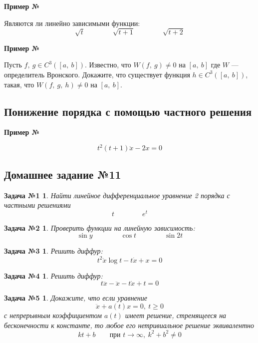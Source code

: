 \documentclass[a4paper,12pt]{article}
\newtheorem*{task1}{Задача №1}
\newtheorem*{task2}{Задача №2}
\newtheorem*{task3}{Задача №3}
\newtheorem*{task4}{Задача №4}
\newtheorem*{task5}{Задача №5}
\newcommand{\dx}{\dot{x}}
\newcommand{\ddx}{\ddot{x}}
\newcommand{\dddx}{\dddot{x}}
\renewcommand{\to}{\longrightarrow}
\begin{document}
\textbf{Пример №}

Являются ли линейно зависимыми функции:
\[\sqrt{t}\qquad \qquad \sqrt{t + 1} \qquad \qquad \sqrt{t + 2}\]

\textbf{Пример №}

Пусть $f,\ g \in C^3([a,\ b])$.
Известно, что $W(f,\ g) \neq 0$ на $[a,\ b]$ где $W$ --- определитель Вронского. 
Докажите, что существует функция $h \in C^3([a,\ b])$, такая, что $W(f,\ g,\ h) \neq 0$ на $[a,\ b]$.

\subsection{Понижение порядка с помощью частного решения}

\textbf{Пример №}

\[t^2(t + 1)\ddx - 2x = 0\]

\subsection{Домашнее задание №11}


\begin{task1}
	Найти линейное дифференциальное уравнение 2 порядка с частными решениями
	\[t \qquad\qquad e^t\]
\end{task1}
%

\begin{task2}
	Проверить функции на линейную зависимость:
	\[\sin y \qquad \qquad \cos t \qquad \qquad \sin  2t\]
\end{task2}
%

\begin{task3}
	Решить диффур:
	\[t^2\ddx \log t - t\dx + x = 0\]
\end{task3}
%	

\begin{task4}
	Решить диффур:
	\[t\dddx -\ddx - t\dx + t = 0\]
\end{task4}
%

\begin{task5}
	Докажите, что если уравнение
	\[\ddx + a(t)x = 0,\ t \geqslant 0\]
	с непрерывным коэффициентом $a(t)$ имеет решение, стремящееся на бесконечности к константе, то любое его нетривиальное решение эквивалентно
	\[kt + b\qquad \text{при } t \to \infty,\ k^2 + b^2 \neq 0\]
\end{task5}
%
\end{document}
